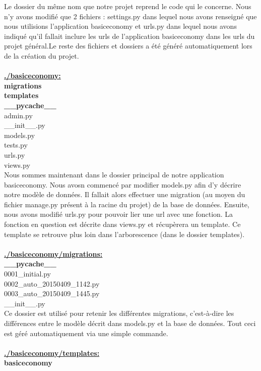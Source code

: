 Le dossier du même nom que notre projet reprend le code qui le concerne.  Nous n'y avons modifié que 2 fichiers : settings.py dans lequel nous avons renseigné que nous utilisions l'application basiceconomy et urls.py dans lequel nous avons indiqué qu'il fallait inclure les urls de l'application basiceconomy dans les urls du projet général.Le reste des fichiers et dossiers a été généré automatiquement lors de la création du projet.
\\
\\
\underline{\textbf{./basiceconomy:}} \\
\textbf{migrations} \\
\textbf{templates} \\
\textbf{\_\_pycache\_\_} \\
admin.py \\
\_\_init\_\_.py \\
models.py \\
tests.py \\
urls.py \\
views.py \\

Nous sommes maintenant dans le dossier principal de notre application basiceconomy.  Nous avosn commencé par modifier models.py afin d'y décrire notre modèle de données.  Il fallait alors effectuer une migration (au moyen du fichier manage.py présent à la racine du projet) de la base de données.  Ensuite,  nous avons modifié urls.py pour pouvoir lier une url avec une fonction.  La fonction en question est décrite dans views.py et récupèrera un template.  Ce template se retrouve plus loin dans l'arborescence (dans le dossier templates).
\\
\\
\underline{\textbf{./basiceconomy/migrations:}} \\
\textbf{\_\_pycache\_\_} \\
0001\_initial.py \\
0002\_auto\_20150409\_1142.py \\
0003\_auto\_20150409\_1445.py \\
\_\_init\_\_.py \\

Ce dossier est utilisé pour retenir les différentes migrations,  c'est-à-dire les différences entre le modèle décrit dans models.py et la base de données.  Tout ceci est géré automatiquement via une simple commande.
\\
\\
\underline{\textbf{./basiceconomy/templates:}} \\
\textbf{basiceconomy} \\

